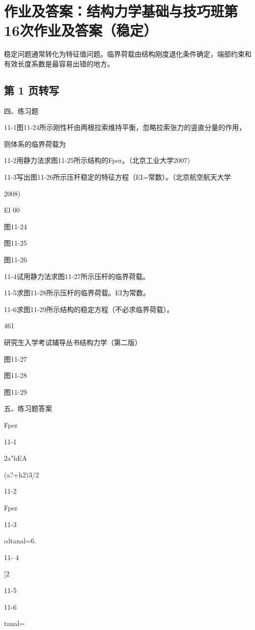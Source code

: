 \section{作业及答案：结构力学基础与技巧班第16次作业及答案（稳定）}
\begin{analysisbox}
稳定问题通常转化为特征值问题。临界荷载由结构刚度退化条件确定，端部约束和有效长度系数是最容易出错的地方。
\end{analysisbox}
\subsection*{第 1 页转写}
四、练习题

11-1图11-24所示刚性杆由两根拉索维持平衡，忽略拉索张力的竖直分量的作用，

则体系的临界荷载为

11-2用静力法求图11-25所示结构的Fper。（北京工业大学2007)

11-3写出图11-26所示压杆稳定的特征方程（EI=常数）。（北京航空航天大学

2008)

El 00

图11-24

图11-25

图11-26

11-4试用静力法求图11-27所示压杆的临界荷载。

11-5求图11-28所示压杆的临界荷载。EI为常数。

11-6求图11-29所示结构的稳定方程（不必求临界荷载）。

461

研究生入学考试辅导丛书结构力学（第二版）

图11-27

图11-28

图11-29

五、练习题答案

Fper

11-1

2a"hEA

(a?+h2)3/2

11-2

Fper

11-3

$\alpha$ltanal=6.

11- 4

[2

11-5

11-6

tanal=

